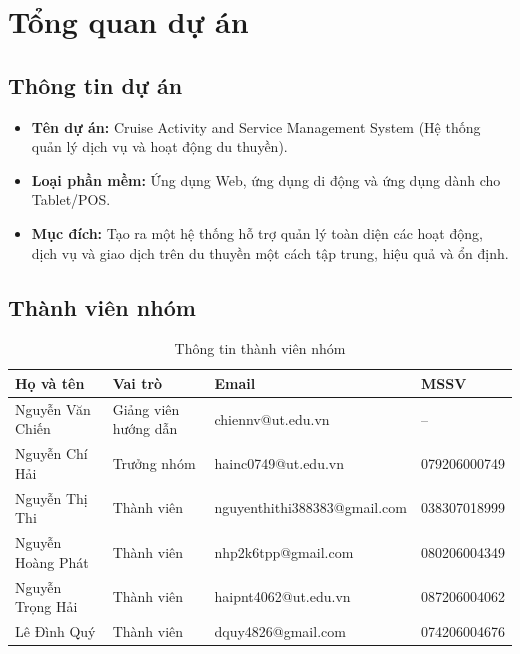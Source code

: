 \section{Tổng quan dự án}
\subsection{Thông tin dự án}
\begin{itemize}
    \item \textbf{Tên dự án:} Cruise Activity and Service Management System (Hệ thống quản lý dịch vụ và hoạt động du thuyền).
    \item \textbf{Loại phần mềm:} Ứng dụng Web, ứng dụng di động và ứng dụng dành cho Tablet/POS.
    \item \textbf{Mục đích:} Tạo ra một hệ thống hỗ trợ quản lý toàn diện các hoạt động, dịch vụ và giao dịch trên du thuyền một cách tập trung, hiệu quả và ổn định.
\end{itemize}

\subsection{Thành viên nhóm}
\begin{table}[htbp]
    \centering
    \small
    \caption{Thông tin thành viên nhóm}
    \begin{tabular}{|p{3.4cm}|p{2.4cm}|p{4.6cm}|p{2.4cm}|}
        \hline
        \textbf{Họ và tên} & \textbf{Vai trò} & \textbf{Email} & \textbf{MSSV} \\
        \hline
        Nguyễn Văn Chiến & Giảng viên hướng dẫn & chiennv@ut.edu.vn & -- \\
        \hline
        Nguyễn Chí Hải & Trưởng nhóm & hainc0749@ut.edu.vn & 079206000749 \\
        \hline
        Nguyễn Thị Thi & Thành viên & nguyenthithi388383@gmail.com & 038307018999 \\
        \hline
        Nguyễn Hoàng Phát & Thành viên & nhp2k6tpp@gmail.com & 080206004349 \\
        \hline
        Nguyễn Trọng Hải & Thành viên & haipnt4062@ut.edu.vn & 087206004062 \\
        \hline
        Lê Đình Quý & Thành viên & dquy4826@gmail.com & 074206004676 \\
        \hline
    \end{tabular}
\end{table}